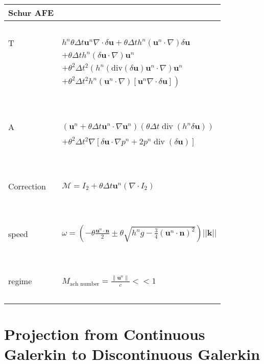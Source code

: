 \documentclass[a4paper, 11pt]{report}
\begin{document}
\begin{table}     
\begin{tabular}{|l|l|}
\hline
Schur AFE &  \\
\hline
~ & ~\\
T &  $h^n\theta\Delta t\boldsymbol{u}^n\nabla \cdot \delta \boldsymbol{u}+\theta\Delta th^n\left(\boldsymbol{u}^n\cdot \nabla \right)\delta \boldsymbol{u}$\\
&$+\theta\Delta th^n\left(\delta \boldsymbol{u}\cdot \nabla\right)\boldsymbol{u}^n$\\
 &$+\theta^2\Delta t^2 \left( h^n\left(\text{div}(\delta \boldsymbol{u})\boldsymbol{u}^n\cdot \nabla\right)\boldsymbol{u}^n\right.$\\
 &$\left.+\theta^2\Delta t^2h^n\left(\boldsymbol{u}^n\cdot \nabla\right)\left[\boldsymbol{u}^n\nabla \cdot \delta \boldsymbol{u}\right]\right)$ \\ 
~ & ~\\
 \hline
   ~& ~\\ 
A &$\left(\boldsymbol{u}^n+\theta \Delta t \boldsymbol{u}^n\cdot \nabla \boldsymbol{u}^n \right)\left(\theta \Delta t \operatorname{div}(h^n \delta \boldsymbol{u})\right) $\\
~&$+\theta^2 \Delta t^2 \nabla\left[ \delta \boldsymbol{u}\cdot \nabla p^n + 2p^n \operatorname{div}(\delta \boldsymbol{u}) \right] $\\
  ~ & ~\\
\hline
 ~ &~ \\
Correction &  $\mathcal{M}=I_2+\theta\Delta t\boldsymbol{u}^n(\nabla\cdot I_2)$ \\ 
  ~ & ~\\
   \hline
 ~ &~ \\
speed & $
\omega=\left(-\theta\frac{\boldsymbol{u}^n\cdot \boldsymbol{n}}{2}\pm\theta\sqrt{h^n g -\frac{3}{4}(\boldsymbol{u}^n\cdot\boldsymbol{n})^2}\right)||\boldsymbol{k}||$\\ 
    ~ & ~\\
\hline
~& ~\\
regime & $M_{\text{ach number}}= \frac{\parallel \boldsymbol{u}^n \parallel }{c}<< 1$\\
~& ~\\
\hline
\end{tabular}
 \end{table}


\chapter{Projection from Continuous Galerkin to Discontinuous Galerkin}
\end{document}
